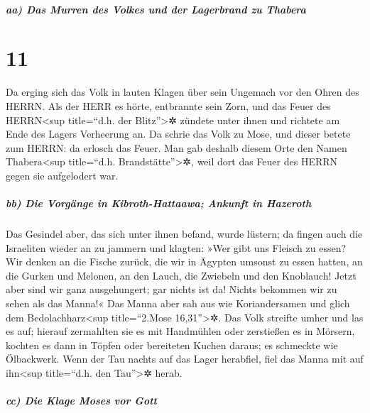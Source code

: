 \hypertarget{aa-das-murren-des-volkes-und-der-lagerbrand-zu-thabera}{%
\subparagraph{aa) Das Murren des Volkes und der Lagerbrand zu
Thabera}\label{aa-das-murren-des-volkes-und-der-lagerbrand-zu-thabera}}

\hypertarget{section-10}{%
\section{11}\label{section-10}}

Da erging sich das Volk in lauten Klagen über sein
Ungemach vor den Ohren des HERRN. Als der HERR es hörte, entbrannte sein
Zorn, und das Feuer des HERRN\textless sup title=``d.h. der
Blitz''\textgreater✲ zündete unter ihnen und richtete am Ende des Lagers
Verheerung an. Da schrie das Volk zu Mose, und dieser
betete zum HERRN: da erlosch das Feuer. Man gab deshalb
diesem Orte den Namen Thabera\textless sup title=``d.h.
Brandstätte''\textgreater✲, weil dort das Feuer des HERRN gegen sie
aufgelodert war.

\hypertarget{bb-die-vorguxe4nge-in-kibroth-hattaawa-ankunft-in-hazeroth}{%
\subparagraph{bb) Die Vorgänge in Kibroth-Hattaawa; Ankunft in
Hazeroth}\label{bb-die-vorguxe4nge-in-kibroth-hattaawa-ankunft-in-hazeroth}}

Das Gesindel aber, das sich unter ihnen befand, wurde
lüstern; da fingen auch die Israeliten wieder an zu jammern und klagten:
»Wer gibt uns Fleisch zu essen? Wir denken an die Fische
zurück, die wir in Ägypten umsonst zu essen hatten, an die Gurken und
Melonen, an den Lauch, die Zwiebeln und den Knoblauch!
Jetzt aber sind wir ganz ausgehungert; gar nichts ist da!
Nichts bekommen wir zu sehen als das Manna!« Das Manna
aber sah aus wie Koriandersamen und glich dem Bedolachharz\textless sup
title=``2.Mose 16,31''\textgreater✲. Das Volk streifte
umher und las es auf; hierauf zermahlten sie es mit Handmühlen oder
zerstießen es in Mörsern, kochten es dann in Töpfen oder bereiteten
Kuchen daraus; es schmeckte wie Ölbackwerk. Wenn der Tau
nachts auf das Lager herabfiel, fiel das Manna mit auf ihn\textless sup
title=``d.h. den Tau''\textgreater✲ herab.

\hypertarget{cc-die-klage-moses-vor-gott}{%
\subparagraph{cc) Die Klage Moses vor
Gott}\label{cc-die-klage-moses-vor-gott}}

